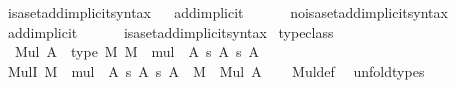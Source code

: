 \begin{isabellebody}
\isanewline
{}\isamarkupfalse%
\ isa{\isacharunderscore}{\kern0pt}set{\isacharunderscore}{\kern0pt}add{\isacharunderscore}{\kern0pt}implicit{\isacharunderscore}{\kern0pt}syntax\isanewline
{}\ \isamarkupfalse%
\ add{\isacharunderscore}{\kern0pt}implicit\ \ {\isacharparenleft}{\kern0pt}\ {\isachardoublequoteopen}{\isacharplus}{\kern0pt}{\isachardoublequoteclose}\ {}{}{\isacharparenright}{\kern0pt}\ \isamarkupfalse%
\isanewline
\isanewline
{}\isamarkupfalse%
\ no{\isacharunderscore}{\kern0pt}isa{\isacharunderscore}{\kern0pt}set{\isacharunderscore}{\kern0pt}add{\isacharunderscore}{\kern0pt}implicit{\isacharunderscore}{\kern0pt}syntax\isanewline
{}\ \isamarkupfalse%
\ add{\isacharunderscore}{\kern0pt}implicit\ \ {\isacharparenleft}{\kern0pt}\ {\isachardoublequoteopen}{\isacharplus}{\kern0pt}{\isachardoublequoteclose}\ {}{}{\isacharparenright}{\kern0pt}\ \isamarkupfalse%
\isanewline
\isanewline
{}\isamarkupfalse%
\ isa{\isacharunderscore}{\kern0pt}set{\isacharunderscore}{\kern0pt}add{\isacharunderscore}{\kern0pt}implicit{\isacharunderscore}{\kern0pt}syntax%
\isadelimdocument
%
\endisadelimdocument
%
\isatagdocument
%
\isamarkuptrue%
%
\endisatagdocument
{\isafolddocument}%
%
\isadelimdocument
%
\endisadelimdocument
{}\isamarkupfalse%
\ {\isacharbrackleft}{\kern0pt}typeclass{\isacharbrackright}{\kern0pt}{\isacharcolon}{\kern0pt}\isanewline
\ \ {\isachardoublequoteopen}Mul\ A\ {\isasymequiv}\ type\ {\isacharparenleft}{\kern0pt}{\isasymlambda}M{\isachardot}{\kern0pt}\ M\ {\isacharat}{\kern0pt}{\isacharat}{\kern0pt}\ mul\ {\isacharcolon}{\kern0pt}\ A\ {\isasymrightarrow}s\ A\ {\isasymrightarrow}s\ A{\isacharparenright}{\kern0pt}{\isachardoublequoteclose}\isanewline
\isanewline
{}\isamarkupfalse%
\ MulI{\isacharcolon}{\kern0pt}\ {\isachardoublequoteopen}M\ {\isacharat}{\kern0pt}{\isacharat}{\kern0pt}\ mul\ {\isacharcolon}{\kern0pt}\ A\ {\isasymrightarrow}s\ A\ {\isasymrightarrow}s\ A\ {\isasymLongrightarrow}\ M\ {\isacharcolon}{\kern0pt}\ Mul\ A{\isachardoublequoteclose}\isanewline
%
\isadelimproof
\ \ %
\endisadelimproof
%
\isatagproof
{}\isamarkupfalse%
\ Mul{\isacharunderscore}{\kern0pt}def\ \isamarkupfalse%
\ unfold{\isacharunderscore}{\kern0pt}types%
\endisatagproof
{\isafoldproof}%

\end{isabellebody}
